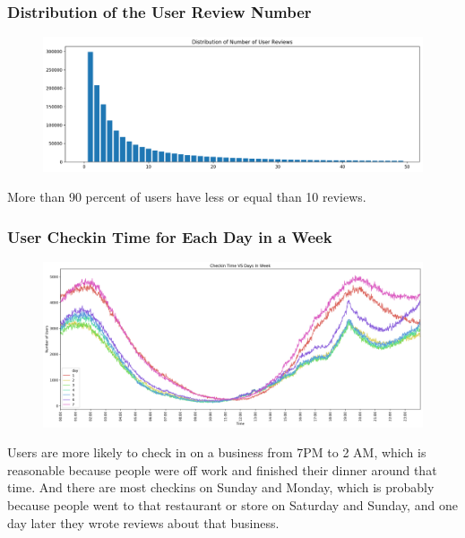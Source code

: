 \documentclass[12pt]{article}
\begin{document}
\subsubsection{Distribution of the User Review Number}
\begin{figure}[H]
\begin{center}
    \includegraphics[width=1.0\textwidth]{../05_dataMining/distributionNumUserReviews.png}
\end{center}
\end{figure}
More than 90 percent of users have less or equal than 10 reviews.

\subsubsection{User Checkin Time for Each Day in a Week}
\begin{figure}[H]
\begin{center}
    \includegraphics[width=1.0\textwidth]{../05_dataMining/checkinTimeVSDay.png}
\end{center}
\end{figure}
Users are more likely to check in on a business from 7PM to 2 AM, which is reasonable because people were off work and finished their dinner around that time. And there are most checkins on Sunday and Monday, which is probably because people went to that restaurant or store on Saturday and Sunday, and one day later they wrote reviews about that business.
\end{document}
